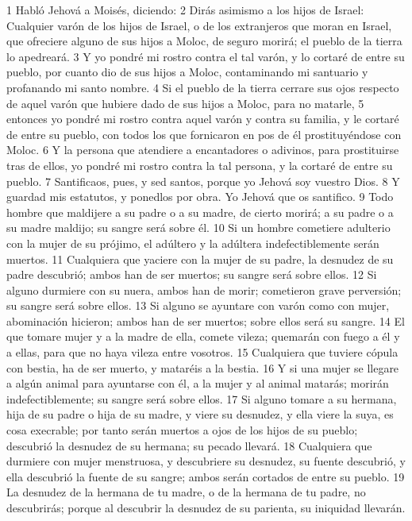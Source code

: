 1 Habló Jehová a Moisés, diciendo:
2 Dirás asimismo a los hijos de Israel: Cualquier varón de los hijos de Israel, o de los extranjeros que moran en Israel, que ofreciere alguno de sus hijos a Moloc, de seguro morirá; el pueblo de la tierra lo apedreará.
3 Y yo pondré mi rostro contra el tal varón, y lo cortaré de entre su pueblo, por cuanto dio de sus hijos a Moloc, contaminando mi santuario y profanando mi santo nombre.
4 Si el pueblo de la tierra cerrare sus ojos respecto de aquel varón que hubiere dado de sus hijos a Moloc, para no matarle,
5 entonces yo pondré mi rostro contra aquel varón y contra su familia, y le cortaré de entre su pueblo, con todos los que fornicaron en pos de él prostituyéndose con Moloc.
6 Y la persona que atendiere a encantadores o adivinos, para prostituirse tras de ellos, yo pondré mi rostro contra la tal persona, y la cortaré de entre su pueblo.
7 Santificaos, pues, y sed santos, porque yo Jehová soy vuestro Dios.
8 Y guardad mis estatutos, y ponedlos por obra. Yo Jehová que os santifico.
9 Todo hombre que maldijere a su padre o a su madre, de cierto morirá; a su padre o a su madre maldijo; su sangre será sobre él.
10 Si un hombre cometiere adulterio con la mujer de su prójimo, el adúltero y la adúltera indefectiblemente serán muertos.
11 Cualquiera que yaciere con la mujer de su padre, la desnudez de su padre descubrió; ambos han de ser muertos; su sangre será sobre ellos.
12 Si alguno durmiere con su nuera, ambos han de morir; cometieron grave perversión; su sangre será sobre ellos.
13 Si alguno se ayuntare con varón como con mujer, abominación hicieron; ambos han de ser muertos; sobre ellos será su sangre.
14 El que tomare mujer y a la madre de ella, comete vileza; quemarán con fuego a él y a ellas, para que no haya vileza entre vosotros.
15 Cualquiera que tuviere cópula con bestia, ha de ser muerto, y mataréis a la bestia.
16 Y si una mujer se llegare a algún animal para ayuntarse con él, a la mujer y al animal matarás; morirán indefectiblemente; su sangre será sobre ellos.
17 Si alguno tomare a su hermana, hija de su padre o hija de su madre, y viere su desnudez, y ella viere la suya, es cosa execrable; por tanto serán muertos a ojos de los hijos de su pueblo; descubrió la desnudez de su hermana; su pecado llevará.
18 Cualquiera que durmiere con mujer menstruosa, y descubriere su desnudez, su fuente descubrió, y ella descubrió la fuente de su sangre; ambos serán cortados de entre su pueblo.
19 La desnudez de la hermana de tu madre, o de la hermana de tu padre, no descubrirás; porque al descubrir la desnudez de su parienta, su iniquidad llevarán.
